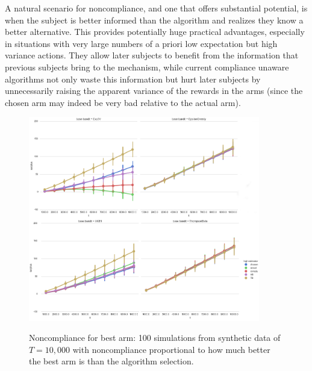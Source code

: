 A natural scenario for noncompliance, and one that offers substantial potential, is when the subject is better informed than the algorithm and realizes they know a better alternative. 
This provides potentially huge practical advantages, especially in situations with very large numbers of a priori low expectation but high variance actions. 
They allow later subjects to benefit from the information that previous subjects bring to the mechanism, while current compliance unaware algorithms not only waste this information but hurt later subjects by unnecessarily raising the apparent variance of the rewards in the arms (since the chosen arm may indeed be very bad relative to the actual arm).



\begin{figure}[t]
	\centering	
	\includegraphics[width=0.9\textwidth]{bandit/figs/ex4.png}\hspace{1cm}
	\label{fig:ex4}
	\caption{Noncompliance for best arm: 100 simulations from synthetic data of $T=10,000$ with noncompliance proportional to how much better the best arm is than the algorithm selection.}
\end{figure}





